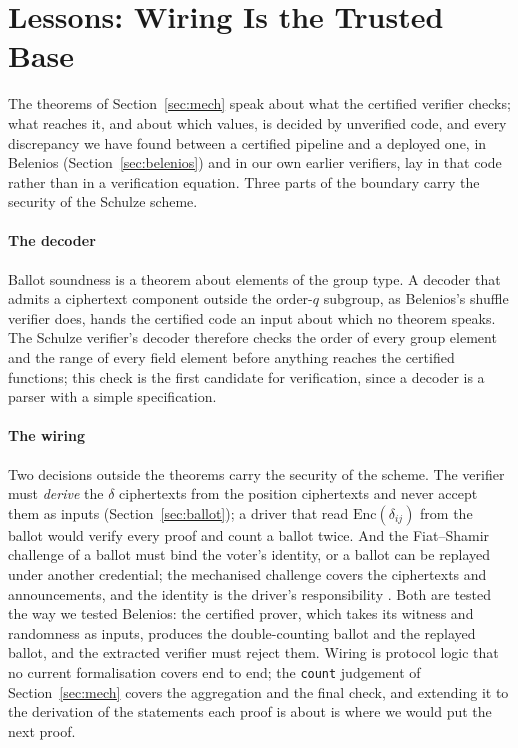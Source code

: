 \section{Lessons: Wiring Is the Trusted Base}\label{sec:lessons}
The theorems of Section~\ref{sec:mech} speak about what the certified
verifier checks; what reaches it, and about which values, is decided by
unverified code, and every discrepancy we have found between a certified
pipeline and a deployed one, in Belenios (Section~\ref{sec:belenios}) and
in our own earlier verifiers, lay in that code rather than in a
verification equation. Three parts of the boundary carry the security of
the Schulze scheme.

\paragraph{The decoder}
Ballot soundness is a theorem about elements of the group type. A decoder
that admits a ciphertext component outside the order-$q$ subgroup, as
Belenios's shuffle verifier does, hands the certified code an input about
which no theorem speaks. The Schulze verifier's decoder therefore checks
the order of every group element and the range of every field element
before anything reaches the certified functions; this check is the first
candidate for verification, since a decoder is a parser with a simple
specification.

\paragraph{The wiring}
Two decisions outside the theorems carry the security of the scheme. The
verifier must \emph{derive} the $\delta$ ciphertexts from the position
ciphertexts and never accept them as inputs (Section~\ref{sec:ballot}); a
driver that read $\mathrm{Enc}(\delta_{ij})$ from the ballot would verify
every proof and count a ballot twice. And the Fiat--Shamir challenge of a
ballot must bind the voter's identity, or a ballot can be replayed under
another credential; the mechanised challenge covers the ciphertexts and
announcements, and the identity is the driver's responsibility
. Both are tested the way we tested Belenios:
the certified prover, which takes its witness and randomness as inputs,
produces the double-counting ballot and the replayed ballot, and the
extracted verifier must reject them. Wiring is protocol logic that no
current formalisation covers end to end; the \texttt{count} judgement of
Section~\ref{sec:mech} covers the aggregation and the final check, and
extending it to the derivation of the statements each proof is about is
where we would put the next proof.

